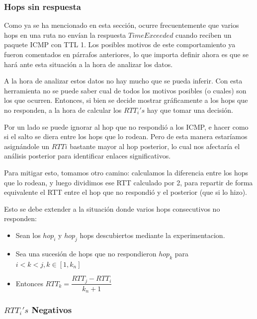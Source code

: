 
\subsubsection*{Hops sin respuesta}
\par Como ya se ha mencionado en esta secci\'on, ocurre frecuentemente que
varios hops en una ruta no env\'ian la respuesta $TimeExceeded$ cuando reciben
un paquete ICMP con TTL 1. Los posibles motivos de este comportamiento ya fueron
comentados en p\'arrafos anteriores, lo que importa definir ahora es que
se har\'a ante esta situaci\'on a la hora de analizar los datos.

\par A la hora de analizar estos datos no hay mucho que se pueda inferir. Con
esta herramienta no se puede saber cual de todos los motivos posibles (o cuales)
son los que ocurren. Entonces, si bien se decide mostrar gr\'aficamente a
los hops que no responden, a la hora de calcular los $RTT_i's$ hay que tomar
una decisi\'on.

\par Por un lado se puede ignorar al hop que no respondi\'o a los ICMP, e
hacer como si el salto se diera entre  los hops que lo rodean. Pero
de esta manera estar\'iamos asign\'andole un $RTTi$ bastante mayor al
hop posterior, lo cual nos afectar\'ia el an\'alisis posterior para identificar
enlaces significativos.

\par Para mitigar esto, tomamos otro camino: calculamos la diferencia entre
los hops que lo rodean, y luego dividimos ese RTT calculado por 2, para repartir
de forma equivalente el RTT entre el hop que no respondi\'o y el posterior
(que si lo hizo).

\par Esto se debe extender a la situaci\'on donde varios hops consecutivos
no responden: 

\begin{itemize}
	\item Sean los $hop_i$ y $hop_j$ hops descubiertos mediante
	la experimentacion.
	\smallskip

	\item Sea una sucesi\'on de hops que no respondieron $hop_k$
	para $i < k <j,k\in[1,k_n]$
	\medskip

	\item Entonces $RTT_k = \dfrac{RTT_j-RTT_i}{k_n+1}$

\end{itemize}

\subsubsection*{$RTT_i's$ Negativos}
